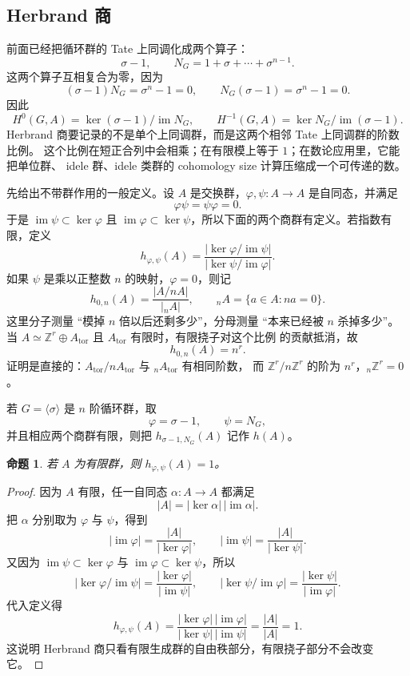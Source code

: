 \documentclass[11pt,a4paper,openany]{ctexbook}
\numberwithin{equation}{chapter}
\newcommand{\Z}{\mathbb{Z}}
\theoremstyle{plain}
\newtheorem{proposition}[theorem]{命题}
\theoremstyle{definition}
\theoremstyle{remark}
\begin{document}
\subsection{Herbrand 商}

前面已经把循环群的 Tate 上同调化成两个算子：
\[
 \sigma-1,\qquad N_G=1+\sigma+\cdots+\sigma^{n-1}.
\]
这两个算子互相复合为零，因为
\[
(\sigma-1)N_G=\sigma^n-1=0,\qquad N_G(\sigma-1)=\sigma^n-1=0.
\]
因此
\[
H^0(G,A)=\ker(\sigma-1)/\operatorname{im}N_G,\qquad
H^{-1}(G,A)=\ker N_G/\operatorname{im}(\sigma-1).
\]
Herbrand 商要记录的不是单个上同调群，而是这两个相邻 Tate 上同调群的阶数比例。
这个比例在短正合列中会相乘；在有限模上等于 $1$；在数论应用里，它能把单位群、
idele 群、idele 类群的 cohomology size 计算压缩成一个可传递的数。

先给出不带群作用的一般定义。设 $A$ 是交换群，$\varphi,\psi:A\to A$ 是自同态，并满足
\[
\varphi\psi=\psi\varphi=0.
\]
于是 $\operatorname{im}\psi\subset\ker\varphi$ 且
$\operatorname{im}\varphi\subset\ker\psi$，所以下面的两个商群有定义。若指数有限，定义
\[
 h_{\varphi,\psi}(A)=
 \frac{|\ker\varphi/\operatorname{im}\psi|}
 {|\ker\psi/\operatorname{im}\varphi|}.
\]
如果 $\psi$ 是乘以正整数 $n$ 的映射，$\varphi=0$，则记
\[
h_{0,n}(A)=\frac{|A/nA|}{|{}_nA|},\qquad
{}_nA=\{a\in A:na=0\}.
\]
这里分子测量 ``模掉 $n$ 倍以后还剩多少''，分母测量 ``本来已经被 $n$ 杀掉多少''。
当 $A\simeq \Z^r\oplus A_{\mathrm{tor}}$ 且 $A_{\mathrm{tor}}$ 有限时，有限挠子对这个比例
的贡献抵消，故
\[
h_{0,n}(A)=n^r.
\]
证明是直接的：$A_{\mathrm{tor}}/nA_{\mathrm{tor}}$ 与 ${}_nA_{\mathrm{tor}}$ 有相同阶数，
而 $\Z^r/n\Z^r$ 的阶为 $n^r$，${}_n\Z^r=0$。

若 $G=\langle\sigma\rangle$ 是 $n$ 阶循环群，取
\[
\varphi=\sigma-1,\qquad \psi=N_G,
\]
并且相应两个商群有限，则把 $h_{\sigma-1,N_G}(A)$ 记作 $h(A)$。

\begin{proposition}
若 $A$ 为有限群，则 $h_{\varphi,\psi}(A)=1$。
\end{proposition}

\begin{proof}
因为 $A$ 有限，任一自同态 $\alpha:A\to A$ 都满足
\[
|A|=|\ker\alpha|\,|\operatorname{im}\alpha|.
\]
把 $\alpha$ 分别取为 $\varphi$ 与 $\psi$，得到
\[
|\operatorname{im}\varphi|=\frac{|A|}{|\ker\varphi|},\qquad
|\operatorname{im}\psi|=\frac{|A|}{|\ker\psi|}.
\]
又因为 $\operatorname{im}\psi\subset\ker\varphi$ 与
$\operatorname{im}\varphi\subset\ker\psi$，所以
\[
|\ker\varphi/\operatorname{im}\psi|
=\frac{|\ker\varphi|}{|\operatorname{im}\psi|},\qquad
|\ker\psi/\operatorname{im}\varphi|
=\frac{|\ker\psi|}{|\operatorname{im}\varphi|}.
\]
代入定义得
\[
h_{\varphi,\psi}(A)
=\frac{|\ker\varphi|\,|\operatorname{im}\varphi|}
{|\ker\psi|\,|\operatorname{im}\psi|}
=\frac{|A|}{|A|}=1.
\]
这说明 Herbrand 商只看有限生成群的自由秩部分，有限挠子部分不会改变它。
\end{proof}
\end{document}
